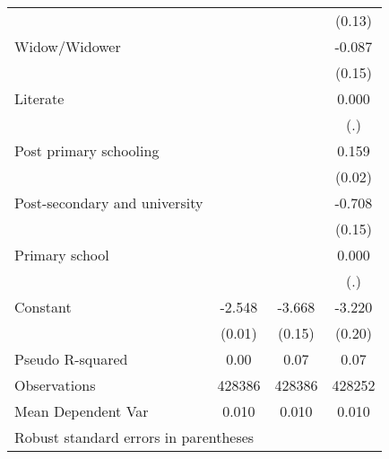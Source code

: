 {\begin{tabular}{l*{3}{c}}
                    &                     &                     &      (0.13)         \\
Widow/Widower       &                     &                     &      -0.087         \\
                    &                     &                     &      (0.15)         \\
Literate            &                     &                     &       0.000         \\
                    &                     &                     &         (.)         \\
Post primary schooling&                     &                     &       0.159\sym{***}\\
                    &                     &                     &      (0.02)         \\
Post-secondary and university&                     &                     &      -0.708\sym{***}\\
                    &                     &                     &      (0.15)         \\
Primary school      &                     &                     &       0.000         \\
                    &                     &                     &         (.)         \\
Constant            &      -2.548\sym{***}&      -3.668\sym{***}&      -3.220\sym{***}\\
                    &      (0.01)         &      (0.15)         &      (0.20)         \\
\hline
Pseudo R-squared    &        0.00         &        0.07         &        0.07         \\
Observations        &      428386         &      428386         &      428252         \\
Mean Dependent Var  &       0.010         &       0.010         &       0.010         \\
\hline\hline
\multicolumn{4}{l}{\footnotesize Robust standard errors in parentheses}\\
\end{tabular}
}
